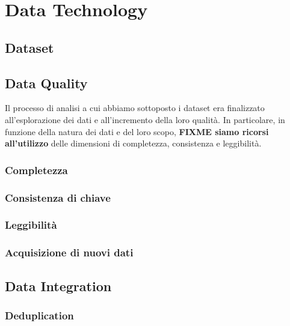 \setcounter{chapter}{0}

\part{Data Technology}

\chapter{Dataset}

\chapter{Data Quality}
\label{chap:data-quality}
Il processo di analisi a cui abbiamo sottoposto i dataset era finalizzato 
all'esplorazione dei dati e all'incremento della loro qualità. In particolare, 
in funzione della natura dei dati e del loro scopo, \textbf{FIXME siamo ricorsi 
all'utilizzo} delle dimensioni di completezza, consistenza e leggibilità.


\section{Completezza}

\section{Consistenza di chiave}

\section{Leggibilità}

\section{Acquisizione di nuovi dati}

\chapter{Data Integration}
\label{chap:data-integration}

\section{Deduplication}

